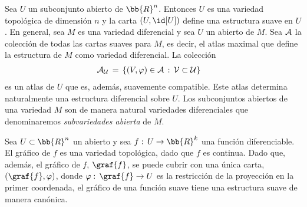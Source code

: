 \begin{ejemplo}
	Sea $U$ un subconjunto abierto de $\bb{R}^{n}$. Entonces $U$ es una
	variedad topol\'{o}gica de dimensi\'{o}n $n$ y la carta
	$(U,\id[U])$ define una estructura suave en $U$. En general, sea
	$M$ es una variedad diferencial y sea $U$ un abierto de $M$.
	Sea $\cal{A}$ la colecci\'{o}n de todas las cartas suaves para
	$M$, es decir, el atlas maximal que define la estructura de $M$
	como variedad diferencial. La colecci\'{o}n
	\begin{align*}
		\cal{A}_{U} & \,=\,\left\lbrace
			(V,\varphi)\in\cal{A}\,:\,V\subset U\right\rbrace
	\end{align*}
	es un atlas de $U$ que es, adem\'{a}s, suavemente compatible.
	Este atlas determina naturalmente una estructura diferencial
	sobre $U$. Los subconjuntos abiertos de una variedad $M$ son
	de manera natural variedades diferenciales que denominaremos
	\emph{subvariedades abierta} de $M$.
\end{ejemplo}

\begin{ejemplo}
	Sea $U\subset\bb{R}^{n}$ un abierto y sea $f:\,U\rightarrow\bb{R}^{k}$
	una funci\'{o}n diferenciable. El gr\'{a}fico de $f$ es una variedad
	topol\'{o}gica, dado que $f$ es continua. Dado que, adem\'{a}s, el
	gr\'{a}fico de $f$, $\graf{f}$, se puede cubrir con una \'{u}nica
	carta, $(\graf{f},\varphi)$, donde $\varphi:\,\graf{f}\rightarrow U$
	es la restricci\'{o}n de la proyecci\'{o}n en la primer coordenada,
	el gr\'{a}fico de una funci\'{o}n suave tiene una estructura suave
	de manera can\'{o}nica.
\end{ejemplo}

